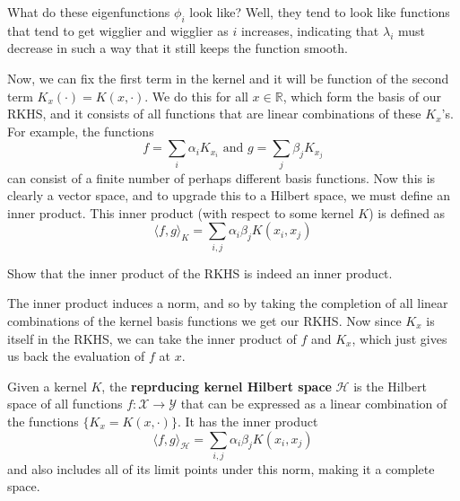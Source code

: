 \documentclass{article}
\begin{document}
  What do these eigenfunctions $\phi_i$ look like? Well, they tend to look like functions that tend to get wigglier and wigglier as $i$ increases, indicating that $\lambda_i$ must decrease in such a way that it still keeps the function smooth. 

  Now, we can fix the first term in the kernel and it will be function of the second term $K_x (\cdot) = K(x, \cdot)$. We do this for all $x \in \mathbb{R}$, which form the basis of our RKHS, and it consists of all functions that are linear combinations of these $K_x$'s. For example, the functions 
  \begin{equation}
    f = \sum_i \alpha_i K_{x_i} \text{ and } g = \sum_j \beta_j K_{x_j} 
  \end{equation}
  can consist of a finite number of perhaps different basis functions. Now this is clearly a vector space, and to upgrade this to a Hilbert space, we must define an inner product. This inner product (with respect to some kernel $K$) is defined as 
  \begin{equation}
    \langle f, g \rangle_K = \sum_{i, j} \alpha_i \beta_j K(x_i, x_j)
  \end{equation}

  \begin{exercise}
    Show that the inner product of the RKHS is indeed an inner product.
  \end{exercise}

  The inner product induces a norm, and so by taking the completion of all linear combinations of the kernel basis functions we get our RKHS. Now since $K_x$ is itself in the RKHS, we can take the inner product of $f$ and $K_x$, which just gives us back the evaluation of $f$ at $x$. 

  \begin{definition}
    Given a kernel $K$, the \textbf{reprducing kernel Hilbert space} $\mathcal{H}$ is the Hilbert space of all functions $f: \mathcal{X} \rightarrow \mathcal{Y}$ that can be expressed as a linear combination of the functions $\{K_x = K(x, \cdot)\}$. It has the inner product 
    \begin{equation}
      \langle f, g \rangle_{\mathcal{H}} = \sum_{i, j} \alpha_i \beta_j K(x_i, x_j)
    \end{equation}
    and also includes all of its limit points under this norm, making it a complete space. 
  \end{definition}
\end{document}

